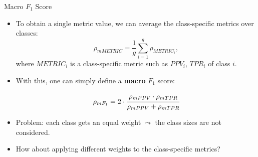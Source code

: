 \documentclass[11pt,compress,t,notes=noshow, xcolor=table]{beamer}
\begin{document}
\begin{vbframe}{Macro $F_1$ Score}
	
	\footnotesize{

	\begin{itemize}

		\item To obtain a single metric value, we can average the class-specific metrics over classes:
        $$\rho_{mMETRIC} = \frac{1}{g}\sum_{i=1}^g \rho_{METRIC_i},$$
        where $METRIC_i$ is a class-specific metric such as $PPV_i$, $TPR_i$ of class $i$.
		
	
		\item With this, one can simply define a \textbf{macro} $F_1$ score:
	
		$$\rho_{mF_1} = 2 \cdot \cfrac{\rho_{mPPV} \cdot \rho_{mTPR}}{\rho_{mPPV} + 
			\rho_{mTPR}}$$

		\item Problem: each class gets an equal weight $\leadsto$ the class sizes are not considered.

        \item How about applying different weights to the class-specific metrics?
%
	\end{itemize}
	}
\end{vbframe}
\end{document}
